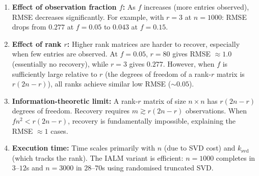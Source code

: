 \documentclass[11pt]{article}
\begin{document}
\begin{enumerate}
    \item \textbf{Effect of observation fraction $f$:}
    As $f$ increases (more entries observed), RMSE decreases significantly.
    For example, with $r=3$ at $n=1000$: RMSE drops from $0.277$ at $f=0.05$
    to $0.043$ at $f=0.15$.

    \item \textbf{Effect of rank $r$:}
    Higher rank matrices are harder to recover, especially when few entries are observed.
    At $f=0.05$, $r=80$ gives RMSE $\approx 1.0$ (essentially no recovery), while
    $r=3$ gives $0.277$. However, when $f$ is sufficiently large relative to $r$
    (the degrees of freedom of a rank-$r$ matrix is $r(2n-r)$), all ranks achieve
    similar low RMSE ($\sim 0.05$).

    \item \textbf{Information-theoretic limit:}
    A rank-$r$ matrix of size $n \times n$ has $r(2n-r)$ degrees of freedom.
    Recovery requires $m \gtrsim r(2n-r)$ observations. When $fn^2 < r(2n-r)$,
    recovery is fundamentally impossible, explaining the RMSE $\approx 1$ cases.

    \item \textbf{Execution time:}
    Time scales primarily with $n$ (due to SVD cost) and $k_{\text{svd}}$ (which
    tracks the rank). The IALM variant is efficient: $n=1000$ completes in $3$--$12$s
    and $n=3000$ in $28$--$70$s using randomised truncated SVD.
\end{enumerate}
\end{document}
